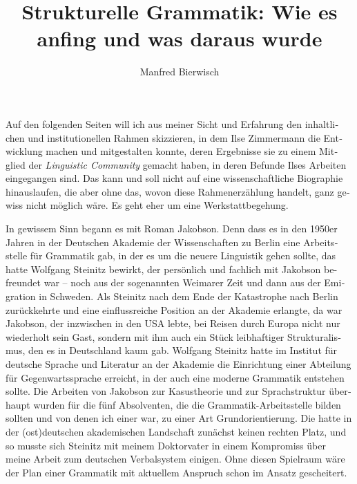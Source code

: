 \documentclass[output=paper,colorlinks,citecolor=brown]{langscibook}
\author[Manfred Bierwisch]{Manfred Bierwisch\affiliation{Leibniz-ZAS Berlin}\orcid{}}
\title[Strukturelle Grammatik: Wie es anfing und was daraus wurde]{Strukturelle Grammatik: Wie es anfing und was daraus wurde}
\begin{document}
\begin{otherlanguage}{german} 
\maketitle
{}
\bigskip

\noindent Auf den folgenden Seiten will ich aus meiner Sicht und Erfahrung den inhaltlichen und institutionellen Rahmen skizzieren, in dem Ilse Zimmermann die Entwicklung machen und mitgestalten konnte, deren Ergebnisse sie zu einem Mitglied der \textit{Linguistic Community} gemacht haben, in deren Befunde Ilses Arbeiten eingegangen sind. Das kann und soll nicht auf eine wissenschaftliche Biographie hinauslaufen, die aber ohne das, wovon diese Rahmenerzählung handelt, ganz gewiss nicht möglich wäre. Es geht eher um eine Werkstattbegehung.

In gewissem Sinn begann es mit Roman Jakobson. Denn dass es in den 1950er Jahren in der Deutschen Akademie der Wissenschaften zu Berlin eine Arbeitsstelle für Grammatik gab, in der es um die neuere Linguistik gehen sollte, das hatte Wolfgang Steinitz bewirkt, der persönlich und fachlich mit Jakobson befreundet war -- noch aus der sogenannten Weimarer Zeit und dann aus der Emigration in Schweden. Als Steinitz nach dem Ende der Katastrophe nach Berlin zurückkehrte und eine einflussreiche Position an der Akademie erlangte, da war Jakobson, der inzwischen in den USA lebte, bei Reisen durch Europa nicht nur wiederholt sein Gast, sondern mit ihm auch ein Stück leibhaftiger Strukturalismus, den es in Deutschland kaum gab. Wolfgang Steinitz hatte im Institut für deutsche Sprache und Literatur an der Akademie die Einrichtung einer Abteilung für Gegenwartssprache erreicht, in der auch eine moderne Grammatik entstehen sollte. Die Arbeiten von Jakobson zur Kasustheorie und zur Sprachstruktur überhaupt wurden für die fünf Absolventen, die die Grammatik-Arbeitsstelle bilden sollten und von denen ich einer war, zu einer Art Grundorientierung. Die hatte in der (ost)deutschen akademischen Landschaft zunächst keinen rechten Platz, und so musste sich Steinitz mit meinem Doktorvater in einem Kompromiss über meine Arbeit zum deutschen Verbalsystem einigen. Ohne diesen Spielraum wäre der Plan einer Grammatik mit aktuellem Anspruch schon im Ansatz gescheitert.


\end{otherlanguage}
\end{document}
